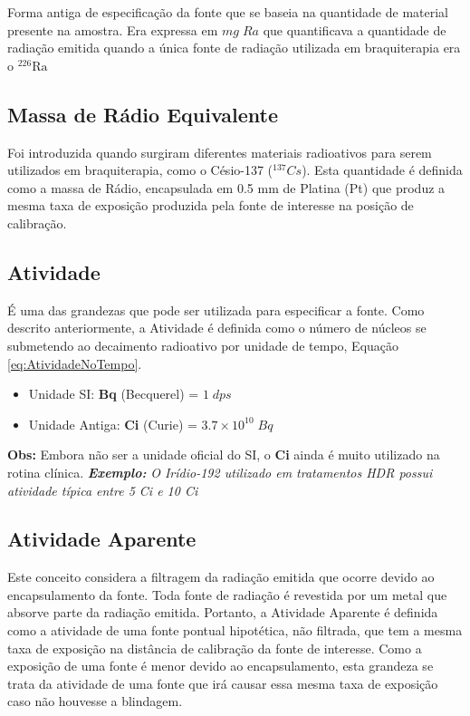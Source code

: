 \documentclass[11pt,a4paper]{article}
\begin{document}
			Forma antiga de especificação da fonte que se baseia na quantidade de material presente na amostra. Era expressa em $mg\; Ra$ que quantificava a quantidade de radiação emitida quando a única fonte de radiação utilizada em braquiterapia era o $\mathrm{{}^{226}Ra}$

		\subsection{Massa de Rádio Equivalente}

			Foi introduzida quando surgiram diferentes materiais radioativos para serem utilizados em braquiterapia, como o Césio-137 (${}^{137}Cs$). Esta quantidade é definida como a massa de Rádio, encapsulada em 0.5 mm de Platina (Pt) que produz a mesma taxa de exposição produzida pela fonte de interesse na posição de calibração.

		\subsection{Atividade}

			É uma das grandezas que pode ser utilizada para especificar a fonte. Como descrito anteriormente, a Atividade é definida como o número de núcleos se submetendo ao decaimento radioativo por unidade de tempo, Equação \ref{eq:AtividadeNoTempo}.

			\begin{itemize}
				\item Unidade SI: \textbf{Bq} (Becquerel) = $1\;dps$
				\item Unidade Antiga: \textbf{Ci} (Curie) = $3.7 \times 10^{10}\; Bq$
			\end{itemize}

			\textbf{\textbf{\textcolor{CarnationPink}{Obs:} } }Embora não ser a unidade oficial do SI, o \textbf{Ci} ainda é muito utilizado na rotina clínica. \textit{\textbf{\textcolor{CarnationPink}{Exemplo:}}} \textit{O Irídio-192 utilizado em tratamentos HDR possui atividade típica entre 5 Ci e 10 Ci}

		\subsection{Atividade Aparente}

			Este conceito considera a filtragem da radiação emitida que ocorre devido ao encapsulamento da fonte. Toda fonte de radiação é revestida por um metal que absorve parte da radiação emitida. Portanto, a Atividade Aparente é definida como a atividade de uma fonte pontual hipotética, não filtrada, que tem a mesma taxa de exposição na distância de calibração da fonte de interesse. Como a exposição de uma fonte é menor devido ao encapsulamento, esta grandeza se trata da atividade de uma fonte que irá causar essa mesma taxa de exposição caso não houvesse a blindagem.
	
\end{document}
